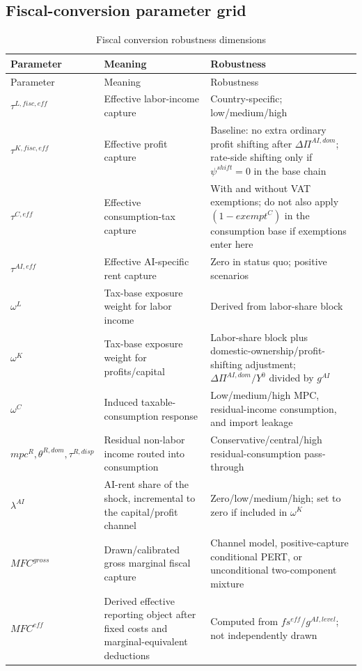 \documentclass[11pt,a4paper]{article}
\begin{document}
\subsection{Fiscal-conversion parameter grid}

\begin{longtable}{>{\raggedright\arraybackslash}p{}>{\raggedright\arraybackslash}p{}>{\raggedright\arraybackslash}p{}}
\caption{Fiscal conversion robustness dimensions}\label{tab:fiscal_conversion_robustness}\\
\toprule
Parameter & Meaning & Robustness \\
\midrule
\endfirsthead
\toprule
Parameter & Meaning & Robustness \\
\midrule
\endhead
$\tau^{L,fisc,eff}$ & Effective labor-income capture & Country-specific; low/medium/high \\
$\tau^{K,fisc,eff}$ & Effective profit capture & Baseline: no extra ordinary profit shifting after $\Delta\Pi^{AI,dom}$; rate-side shifting only if $\psi^{shift}=0$ in the base chain \\
$\tau^{C,eff}$ & Effective consumption-tax capture & With and without VAT exemptions; do not also apply $(1-exempt^C)$ in the consumption base if exemptions enter here \\
$\tau^{AI,eff}$ & Effective AI-specific rent capture & Zero in status quo; positive scenarios \\
$\omega^L$ & Tax-base exposure weight for labor income & Derived from labor-share block \\
$\omega^K$ & Tax-base exposure weight for profits/capital & Labor-share block plus domestic-ownership/profit-shifting adjustment; $\Delta\Pi^{AI,dom}/Y^0$ divided by $g^{AI}$ \\
$\omega^C$ & Induced taxable-consumption response & Low/medium/high MPC, residual-income consumption, and import leakage \\
$mpc^R,\theta^{R,dom},\tau^{R,disp}$ & Residual non-labor income routed into consumption & Conservative/central/high residual-consumption pass-through \\
$\lambda^{AI}$ & AI-rent share of the shock, incremental to the capital/profit channel & Zero/low/medium/high; set to zero if included in $\omega^K$ \\
$MFC^{gross}$ & Drawn/calibrated gross marginal fiscal capture & Channel model, positive-capture conditional PERT, or unconditional two-component mixture \\
$MFC^{eff}$ & Derived effective reporting object after fixed costs and marginal-equivalent deductions & Computed from $fs^{eff}/g^{AI,level}$; not independently drawn \\

\end{longtable}
\end{document}
